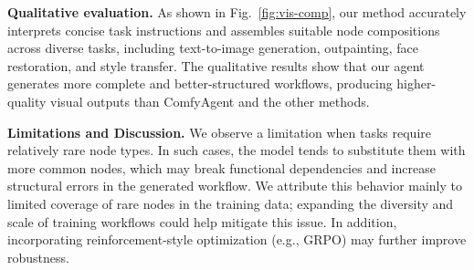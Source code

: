 \documentclass[runningheads]{llncs}
\begin{document}
\begin{table}[!t]

\centering
\caption{Comparison with Qwen3-32B Q2P on workflow generation.
Read as Tab. \ref{tab:comfybench_overall}}
\label{tab:qwen_comparison}

\end{table}

\noindent \textbf{Qualitative evaluation.}
As shown in Fig.~\ref{fig:vis-comp}, our method accurately interprets concise task instructions and assembles suitable node compositions across diverse tasks, including text-to-image generation, outpainting, face restoration, and style transfer. The qualitative results show that our agent generates more complete and better-structured workflows, producing higher-quality visual outputs than ComfyAgent and the other methods.

\noindent \textbf{Limitations and Discussion.} We observe a limitation when tasks require relatively rare node types. In such cases, the model tends to substitute them with more common nodes, which may break functional dependencies and increase structural errors in the generated workflow. We attribute this behavior mainly to limited coverage of rare nodes in the training data; expanding the diversity and scale of training workflows could help mitigate this issue. In addition, incorporating reinforcement-style optimization (e.g., GRPO) may further improve robustness.
\end{document}
